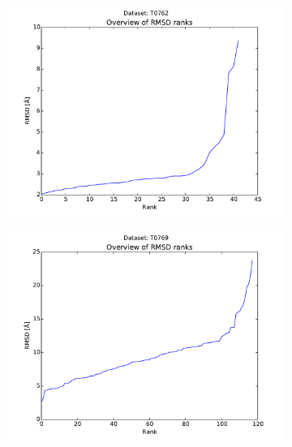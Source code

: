 \documentclass[11pt,a4paper]{article}
\renewcommand{\(}{\left (}
\renewcommand{\)}{\right )}
\begin{document}
\begin{figure}[!h]
	\begin{subfigure}{.5\textwidth}
		\includegraphics[width=\textwidth]{../results/rank_T0762}
		\subcaption{}
	\end{subfigure}
	\begin{subfigure}{.5\textwidth}
		\includegraphics[width=\textwidth]{../results/rank_T0769}
		\subcaption{}
	\end{subfigure}	
	

\end{figure}
\end{document}
